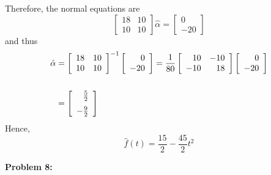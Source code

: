 \documentclass[letterpaper]{article}
\begin{document}
\begin{enumerate}
Therefore, the normal equations are
$$\left[ \begin{array}{rr}  18&  10\\  10 & 10\end{array} \right] \hat{\alpha} = \left[ \begin{array}{r} 0 \\ -20 \end{array} \right] $$
and thus
 \begin{align*} \hat{\alpha} & = \left[ \begin{array}{rr}  18&  10\\  10 & 10\end{array} \right]^{-1} \left[ \begin{array}{r} 0 \\ -20\end{array} \right] = \frac{1}{80} \left[ \begin{array}{rr}  10&  -10\\  -10 & 18\end{array} \right] \left[ \begin{array}{r} 0 \\ -20\end{array} \right]\\
 \\
 &=\left[ \begin{array}{r} \frac{5}{2} \medskip \\ -\frac{9}{2}\end{array} \right]
 \end{align*}
 Hence,
 $$\boxed{\hat{f}(t) =  \frac{15}{2} - \frac{45}{2} t^2 }$$

\end{enumerate}

\newpage

\noindent \textbf{Problem 8:}
\end{document}
